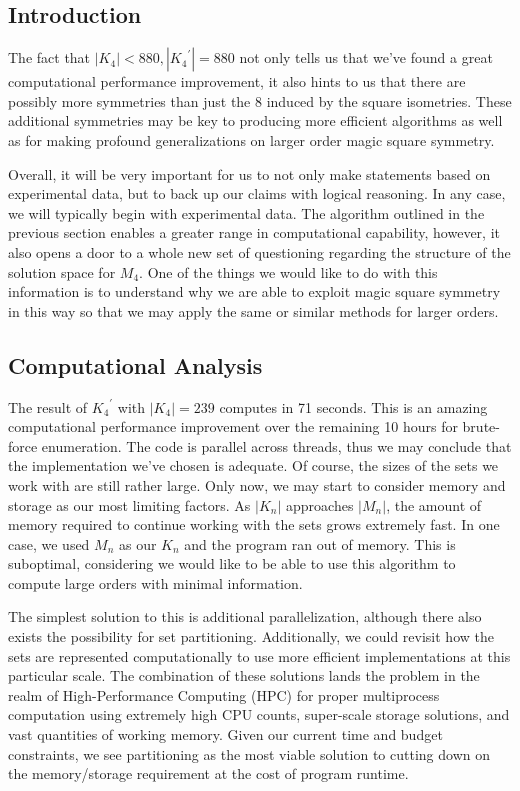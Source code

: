 \documentclass{rhumj_new}
\begin{document}
\subsection{Introduction}

The fact that $\left|K_4\right|< 880, \left|{K_4}^\prime\right|=880$ not only tells us that we've
found a great computational performance improvement, it also hints to us that there are possibly
more symmetries than just the 8 induced by the square isometries. These additional symmetries may
be key to producing more efficient algorithms as well as for making profound generalizations on
larger order magic square symmetry.

Overall, it will be very important for us to not only make statements based on experimental
data, but to back up our claims with logical reasoning. In any case, we will typically begin with
experimental data. The algorithm outlined in the previous section enables a greater range in
computational capability, however, it also opens a door to a whole new set of questioning regarding
the structure of the solution space for $M_4$. One of the things we would like to do with this
information is to understand why we are able to exploit magic square symmetry in this way so that
we may apply the same or similar methods for larger orders.

\subsection{Computational Analysis}

The result of ${K_4}^\prime$ with $\left|K_4\right|=239$ computes in 71 seconds. This is an
amazing computational performance improvement over the remaining 10 hours for brute-force
enumeration. The code is parallel across threads, thus we may conclude that the implementation
we've chosen is adequate. Of course, the sizes of the sets we work with are still rather large.
Only now, we may start to consider memory and storage as our most limiting factors. As
$\left|K_n\right|$ approaches $\left|M_n\right|$, the amount of memory required to continue working
with the sets grows extremely fast. In one case, we used $M_n$ as our $K_n$ and the program ran out
of memory. This is suboptimal, considering we would like to be able to use this algorithm to
compute large orders with minimal information.

The simplest solution to this is additional parallelization, although there also exists the
possibility for set partitioning. Additionally, we could revisit how the sets are represented
computationally to use more efficient implementations at this particular scale.
The combination of these solutions lands the problem in the realm
of High-Performance Computing (HPC) for proper multiprocess computation using extremely high CPU
counts, super-scale storage solutions, and vast quantities of working memory. Given our current
time and budget constraints, we see partitioning as the most viable solution to cutting down on the
memory/storage requirement at the cost of program runtime.
\end{document}
